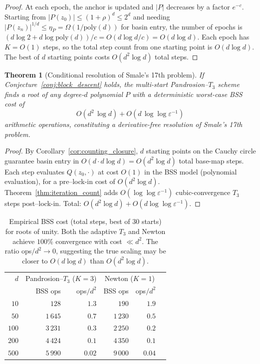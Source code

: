 \documentclass[10pt,a4paper,oneside]{book}
\newtheorem{theorem}{Theorem}[chapter]
\theoremstyle{definition}
\theoremstyle{remark}
\begin{document}
\begin{proof}
At each epoch, the anchor is updated and $|P|$ decreases by a factor $e^{-c}$.  Starting from $|P(z_0)| \leq (1+\rho)^d \leq 2^d$ and needing $|P(z_n)|^{1/d} \leq \eta_P = \Omega(1/\mathrm{poly}(d))$ for basin entry, the number of epochs is $(d\log 2 + d\log\mathrm{poly}(d))/c = O(d\log d/c) = O(d\log d)$.  Each epoch has $K = O(1)$ steps, so the total step count from one starting point is $O(d\log d)$.  The best of $d$ starting points costs $O(d^2\log d)$ total steps.
\end{proof}

\begin{theorem}[Conditional resolution of Smale's 17th problem]
\label{thm:smale_conditional}
If Conjecture~\ref{conj:block_descent} holds, the multi-start Pandrosion--$T_3$ scheme finds a root of any degree-$d$ polynomial $P$ with a deterministic worst-case BSS cost of
\begin{equation}
  \label{eq:smale_cost}
  O(d^2\,\log d) + O(d\,\log\!\log\varepsilon^{-1})
\end{equation}
arithmetic operations, constituting a derivative-free resolution of Smale's 17th problem.
\end{theorem}

\begin{proof}
By Corollary~\ref{cor:counting_closure}, $d$ starting points on the Cauchy circle guarantee basin entry in $O(d \cdot d\log d) = O(d^2\log d)$ total base-map steps.  Each step evaluates $Q(z_0,\cdot)$ at cost $O(1)$ in the BSS model (polynomial evaluation), for a pre--lock-in cost of $O(d^2\log d)$.  Theorem~\ref{thm:iteration_count} adds $O(\log\!\log\varepsilon^{-1})$ cubic-convergence $T_3$ steps post--lock-in.  Total: $O(d^2\log d) + O(d\log\!\log\varepsilon^{-1})$.
\end{proof}

\begin{table}[H]
\centering
\renewcommand{\arraystretch}{1.2}
\begin{tabular}{rrrrrr}
\toprule
$d$ & \multicolumn{2}{c}{Pandrosion--$T_3$ ($K\!=\!3$)} & \multicolumn{2}{c}{Newton ($K\!=\!1$)} \\
    & BSS ops & ops$/d^2$ & BSS ops & ops$/d^2$ \\
\midrule
$10$   & $128$      & $1.3$ & $190$  & $1.9$ \\
$50$   & $1\,645$   & $0.7$ & $1\,230$ & $0.5$ \\
$100$  & $3\,231$   & $0.3$ & $2\,250$ & $0.2$ \\
$200$  & $4\,424$   & $0.1$ & $4\,350$ & $0.1$ \\
$500$  & $5\,990$   & $0.02$ & $9\,000$ & $0.04$ \\
\bottomrule
\end{tabular}
\caption{Empirical BSS cost (total steps, best of $30$ starts) for roots of unity.  Both the adaptive $T_3$ and Newton achieve $100\%$ convergence with cost $\ll d^2$.  The ratio ops$/d^2 \to 0$, suggesting the true scaling may be closer to $O(d\log d)$ than $O(d^2\log d)$.}
\label{tab:bss_scaling}
\end{table}
\end{document}
